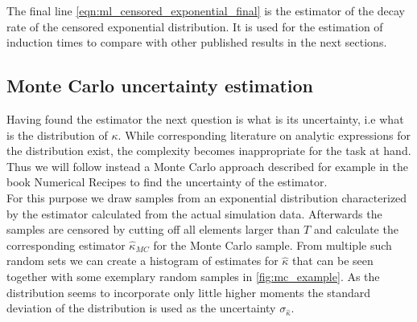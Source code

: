 The final line \autoref{eqn:ml_censored_exponential_final} is the estimator of the decay rate of the censored exponential distribution. It is used for the estimation of induction times to compare with other published results in the next sections.
\subsection{Monte Carlo uncertainty estimation}
\label{sec:mc_uncertainty}
Having found the estimator the next question is what is its uncertainty, i.e what is the distribution of $\kappa$. While corresponding literature on analytic expressions for the distribution exist\cite{Chen1988}, the complexity becomes inappropriate for the task at hand. Thus we will follow instead a Monte Carlo approach described for example in the book Numerical Recipes\cite{Press1992} to find the uncertainty of the estimator.\\

For this purpose we draw samples from an exponential distribution characterized by the estimator calculated from the actual simulation data. Afterwards the samples are censored by cutting off all elements larger than $T$ and calculate the corresponding estimator $\hat{\kappa}_{MC}$ for the Monte Carlo sample. From multiple such random sets we can create a histogram of estimates for $\hat{\kappa}$ that can be seen together with some exemplary random samples in \autoref{fig:mc_example}. As the distribution seems to incorporate only little higher moments the standard deviation of the distribution is used as the uncertainty $\sigma_{\hat{\kappa}}$.

